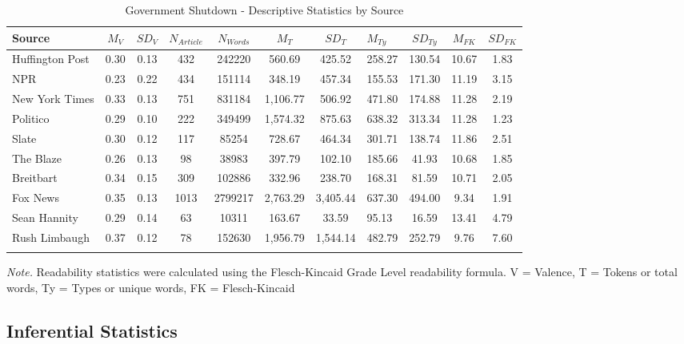 \documentclass[english,,man]{apa6}
\begin{document}
\begin{table}[tbp]
\begin{center}
\begin{threeparttable}
\caption{\label{tab:exp2-source-descriptives-gs}Government Shutdown - Descriptive Statistics by Source}
\small{
\begin{tabular}{lcccccclccc}
\toprule
Source & $M_V$ & $SD_V$ & $N_{Article}$ & $N_{Words}$ & $M_T$ & $SD_T$ & $M_{Ty}$ & $SD_{Ty}$ & $M_{FK}$ & $SD_{FK}$\\
\midrule
Huffington Post & 0.30 & 0.13 & 432 & 242220 & 560.69 & 425.52 & 258.27 & 130.54 & 10.67 & 1.83\\
NPR & 0.23 & 0.22 & 434 & 151114 & 348.19 & 457.34 & 155.53 & 171.30 & 11.19 & 3.15\\
New York Times & 0.33 & 0.13 & 751 & 831184 & 1,106.77 & 506.92 & 471.80 & 174.88 & 11.28 & 2.19\\
Politico & 0.29 & 0.10 & 222 & 349499 & 1,574.32 & 875.63 & 638.32 & 313.34 & 11.28 & 1.23\\
Slate & 0.30 & 0.12 & 117 & 85254 & 728.67 & 464.34 & 301.71 & 138.74 & 11.86 & 2.51\\
The Blaze & 0.26 & 0.13 & 98 & 38983 & 397.79 & 102.10 & 185.66 & 41.93 & 10.68 & 1.85\\
Breitbart & 0.34 & 0.15 & 309 & 102886 & 332.96 & 238.70 & 168.31 & 81.59 & 10.71 & 2.05\\
Fox News & 0.35 & 0.13 & 1013 & 2799217 & 2,763.29 & 3,405.44 & 637.30 & 494.00 & 9.34 & 1.91\\
Sean Hannity & 0.29 & 0.14 & 63 & 10311 & 163.67 & 33.59 & 95.13 & 16.59 & 13.41 & 4.79\\
Rush Limbaugh & 0.37 & 0.12 & 78 & 152630 & 1,956.79 & 1,544.14 & 482.79 & 252.79 & 9.76 & 7.60\\
\bottomrule
\addlinespace
\end{tabular}
}
\begin{tablenotes}[para]
\normalsize{\textit{Note.} Readability statistics were calculated using the Flesch-Kincaid Grade Level readability formula. V = Valence, T = Tokens or total words, Ty = Types or unique words, FK = Flesch-Kincaid}
\end{tablenotes}
\end{threeparttable}
\end{center}
\end{table}

\subsection{Inferential Statistics}\label{inferential-statistics-1}
\end{document}
